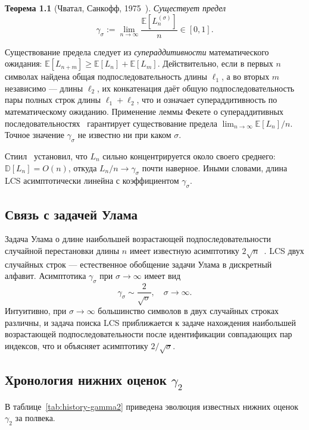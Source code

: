 \textbf{Теорема 1.1} (Чватал, Санкофф, 1975~\cite{chvatal1975}).
\emph{Существует предел}
\[
    \gamma_\sigma := \lim_{n \to \infty} \frac{\mathbb{E}[L_n^{(\sigma)}]}{n} \in [0, 1].
\]

Существование предела следует из \emph{супераддитивности} математического ожидания: $\mathbb{E}[L_{n+m}] \geq \mathbb{E}[L_n] + \mathbb{E}[L_m]$. Действительно, если в первых $n$ символах найдена общая подпоследовательность длины $\ell_1$, а во вторых $m$ независимо --- длины $\ell_2$, их конкатенация даёт общую подпоследовательность пары полных строк длины $\ell_1 + \ell_2$, что и означает супераддитивность по математическому ожиданию. Применение леммы Фекете о супераддитивных последовательностях~\cite{fekete1923} гарантирует существование предела $\lim_{n \to \infty} \mathbb{E}[L_n]/n$. Точное значение $\gamma_\sigma$ не известно ни при каком $\sigma$.

Стиил~\cite{steele1986} установил, что $L_n$ сильно концентрируется около своего среднего: $\mathbb{D}[L_n] = O(n)$, откуда $L_n / n \to \gamma_\sigma$ почти наверное. Иными словами, длина LCS асимптотически линейна с коэффициентом $\gamma_\sigma$.

\subsection{Связь с задачей Улама}

Задача Улама о длине наибольшей возрастающей подпоследовательности случайной перестановки длины $n$ имеет известную асимптотику $2\sqrt{n}$~\cite{vershik1977,loganshepp1977,baikdeiftjohansson1999}. LCS двух случайных строк --- естественное обобщение задачи Улама в дискретный алфавит. Асимптотика $\gamma_\sigma$ при $\sigma \to \infty$ имеет вид~\cite{kiwi2005}
\[
    \gamma_\sigma \sim \frac{2}{\sqrt{\sigma}}, \quad \sigma \to \infty.
\]
Интуитивно, при $\sigma \to \infty$ большинство символов в двух случайных строках различны, и задача поиска LCS приближается к задаче нахождения наибольшей возрастающей подпоследовательности после идентификации совпадающих пар индексов, что и объясняет асимптотику $2/\sqrt{\sigma}$.

\subsection{Хронология нижних оценок $\gamma_2$}

В таблице~\ref{tab:history-gamma2} приведена эволюция известных нижних оценок $\gamma_2$ за полвека.


